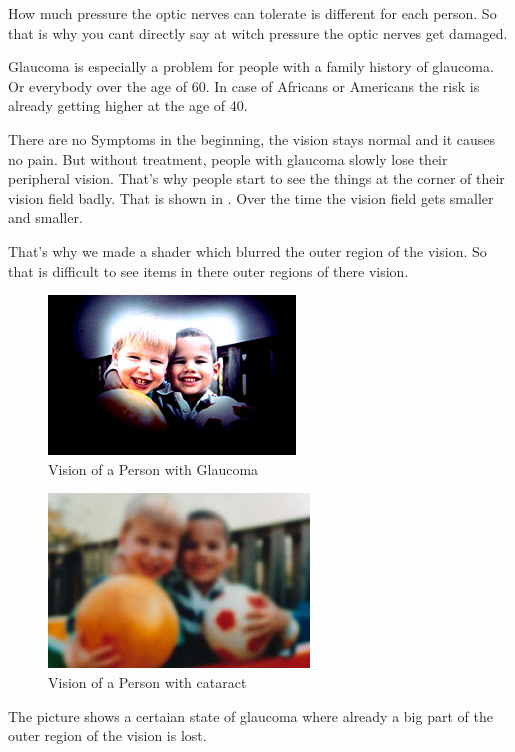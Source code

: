 \documentclass{sig-alternate-05-2015}
\begin{document}
How much pressure the optic nerves can tolerate is different for each person. So that is why you cant directly say at witch pressure the optic nerves get damaged.

Glaucoma is especially a problem for people with a family history of glaucoma. Or everybody over the age of 60. In case of Africans or Americans the risk is already getting higher at the age of 40.

There are no Symptoms in the beginning, the vision stays normal and it causes no pain. But without treatment, people with glaucoma slowly lose their peripheral vision. That's why people start to see the things at the corner of their vision field badly. That is shown in . Over the time the vision field gets smaller and smaller.~\cite{glaucomafacts}

That's why we made a shader which blurred the outer region of the vision. So that is difficult to see items in there outer regions of there vision.
%
\begin{figure}
    \centering
    \includegraphics[width=\columnwidth]{glaucomavision.png}
    \caption{Vision of a Person with Glaucoma}
    \label{fig:glaucoma}
\end{figure}
%
\begin{figure}
    \centering
    \includegraphics[width=\columnwidth]{cataractvision.png}
    \caption{Vision of a Person with cataract}
    \label{fig:cataract}
\end{figure}
%
The picture  shows a certaian state of glaucoma where already a big part of the outer region of the vision is lost.
\end{document}
